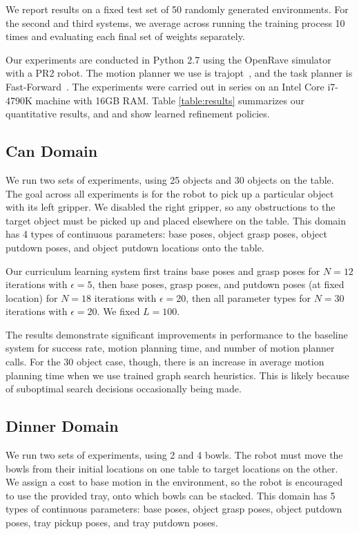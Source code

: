 We report results on a fixed test set of 50 randomly generated environments.
For the second and third systems, we average across running the training process 10 times
and evaluating each final set of weights separately.

Our experiments are conducted in Python 2.7 using the OpenRave simulator~\cite{Diankov_2008_6117} with a PR2 robot.
The motion planner we use is trajopt~\cite{schulman2013finding}, and the task planner is Fast-Forward~\cite{FF}.
The experiments were carried out in series on an Intel Core i7-4790K machine with 16GB RAM.
Table \ref{table:results} summarizes our quantitative results, and  and 
show learned refinement policies.

\subsection{Can Domain}
We run two sets of experiments, using 25 objects and 30 objects on the table.
The goal across all experiments is for the robot to pick up a particular object with its
left gripper. We disabled the right gripper, so any obstructions to the target object must be picked up and
placed elsewhere on the table. This domain has 4 types of continuous parameters: base poses, object grasp
poses, object putdown poses, and object putdown locations onto the table.

Our curriculum learning system first trains base poses and grasp poses for $N = 12$ iterations with $\epsilon = 5$,
then base poses, grasp poses, and putdown poses (at fixed location) for $N = 18$ iterations with $\epsilon = 20$,
then all parameter types for $N = 30$ iterations with $\epsilon = 20$. We fixed $L = 100$.

The results demonstrate significant improvements in performance to the baseline system for success rate, motion planning
time, and number of motion planner calls. For the 30 object case, though,
there is an increase in average motion planning time when we use trained graph search heuristics. This is likely because of suboptimal
search decisions occasionally being made.

\subsection{Dinner Domain}
We run two sets of experiments, using 2 and 4 bowls. The robot must move the
bowls from their initial locations on one table to target locations on the other. We assign a cost to
base motion in the environment, so the robot is encouraged to use the provided tray, onto which bowls can be stacked.
This domain has 5 types of continuous parameters: base poses, object grasp poses, object putdown poses, tray pickup
poses, and tray putdown poses.


